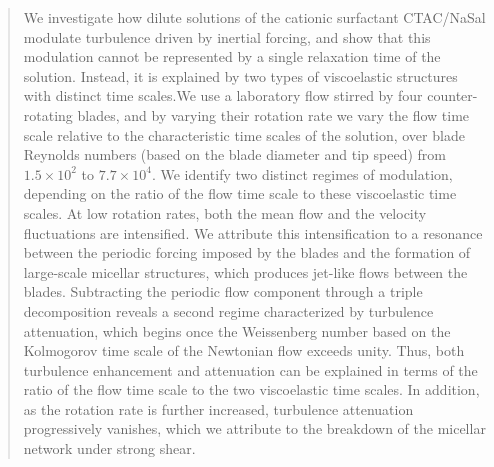 \documentclass[aps,prfluids,groupedaddress,showkeys,11pt,tightenlines]{revtex4-2}
\begin{document}
\begin{abstract}


We investigate how dilute solutions of the cationic surfactant CTAC/NaSal modulate turbulence driven by inertial forcing, and show that this modulation cannot be represented by a single relaxation time of the solution. Instead, it is explained by two types of viscoelastic structures with distinct time scales.We use a laboratory flow stirred by four counter-rotating blades, and by varying their rotation rate we vary the flow time scale relative to the characteristic time scales of the solution, over blade Reynolds numbers (based on the blade diameter and tip speed) from $1.5\times10^{2}$ to $7.7\times10^{4}$. We identify two distinct regimes of modulation, depending on the ratio of the flow time scale to these viscoelastic time scales. At low rotation rates, both the mean flow and the velocity fluctuations are intensified. We attribute this intensification to a resonance between the periodic forcing imposed by the blades and the formation of large-scale micellar structures, which produces jet-like flows between the blades. Subtracting the periodic flow component through a triple decomposition reveals a second regime characterized by turbulence attenuation, which begins once the Weissenberg number based on the Kolmogorov time scale of the Newtonian flow exceeds unity. Thus, both turbulence enhancement and attenuation can be explained in terms of the ratio of the flow time scale to the two viscoelastic time scales. In addition, as the rotation rate is further increased, turbulence attenuation progressively vanishes, which we attribute to the breakdown of the micellar network under strong shear.


\end{abstract}
\end{document}
